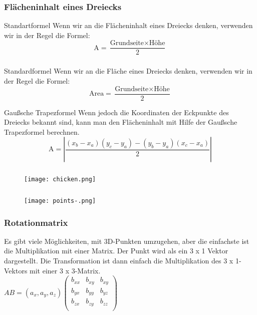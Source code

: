 \documentclass{beamer}
\begin{document}
\begin{frame}
	\frametitle{Flächeninhalt eines Dreiecks}
	\vspace{-2.8cm}
	\begin{block}{Standartformel}
		\vspace{4mm}
		\textmd{\small Wenn wir an die Flächeninhalt eines Dreiecks denken, verwenden wir in der Regel die Formel:}
		\[
		\text{A} = \frac{\text{Grundseite} \times \text{Höhe}}{2}
		\]
	\end{block}
\end{frame}
\begin{frame}
	\frametitle{\phantom{}}
	\begin{block}{Standardformel}
		\vspace{4mm}
		\textmd{\small Wenn wir an die Fläche eines Dreiecks denken, verwenden wir in der Regel die Formel:}
		\[
		\text{Area} = \frac{\text{Grundseite} \times \text{Höhe}}{2}
		\]
	\end{block}
	\vspace{-5mm}
	\begin{block}{Gaußsche Trapezformel}
		\vspace{4mm}
		\textmd{\small Wenn jedoch die Koordinaten der Eckpunkte des Dreiecks bekannt sind, kann man den Flächeninhalt mit Hilfe der Gaußsche Trapezformel berechnen.}
		\[
		\text{A} = |\frac{(x_{b} - x_{a})(y_{c} - y_{a}) - (y_{b} - y_{a})(x_{c} - x_{a})}{2}|
		\]	
		\end{block}
\end{frame}
\begin{frame}
	\frametitle{\phantom{}}	
	\begin{figure}
		\centering
		\texttt{[image: chicken.png]}
	\end{figure}
\end{frame}

\begin{frame}
	\frametitle{\phantom{}}	
	\begin{figure}
		\centering
		\texttt{[image: points-.png]} 
	\end{figure}
\end{frame}

\begin{frame}
	\frametitle{Rotationmatrix}
		\vspace{-2.8cm}
		\textmd{\small Es gibt viele Möglichkeiten, mit 3D-Punkten umzugehen, aber die einfachste ist die Multiplikation mit einer Matrix. Der Punkt wird als ein 3 x 1 Vektor dargestellt. Die Transformation ist dann einfach die Multiplikation des 3 x 1-Vektors mit einer 3 x 3-Matrix.} \\
	\vspace{0.3cm}
	\centering
	$ AB = (a_{x}, a_{y}, a_{z})
	\begin{pmatrix}
		b_{xx} & b_{xy} & b_{xy} \\
		b_{yx} & b_{yy} & b_{yz} \\
		b_{zx} & b_{zy} & b_{zz} \\
	\end{pmatrix}
	$	
	\end{frame}
	
\end{document}
